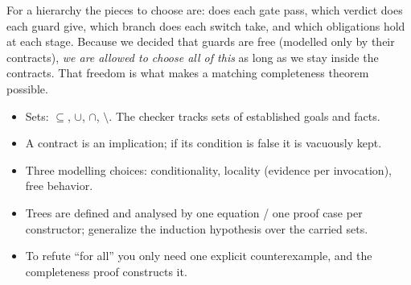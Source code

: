 For a hierarchy the pieces to choose are: does each gate pass, which verdict does each guard give, which branch does each switch take, and which obligations hold at each stage. Because we decided that guards are free (modelled only by their contracts), \emph{we are allowed to choose all of this} as long as we stay inside the contracts. That freedom is what makes a matching completeness theorem possible.

\begin{recap}
\begin{itemize}
\item Sets: $\subseteq$, $\cup$, $\cap$, $\setminus$. The checker tracks sets of established goals and facts.
\item A contract is an implication; if its condition is false it is vacuously kept.
\item Three modelling choices: conditionality, locality (evidence per invocation), free behavior.
\item Trees are defined and analysed by one equation / one proof case per constructor; generalize the induction hypothesis over the carried sets.
\item To refute ``for all'' you only need one explicit counterexample, and the completeness proof constructs it.
\end{itemize}
\end{recap}
